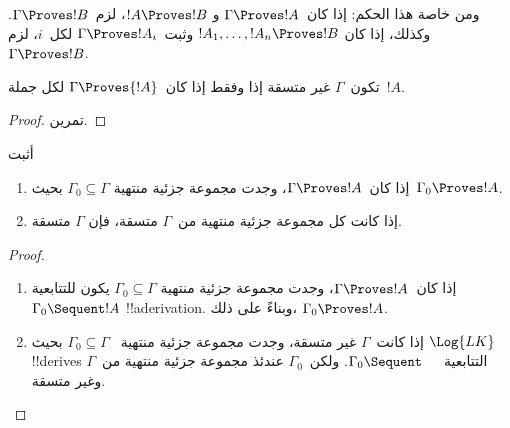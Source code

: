 \documentclass[../../../include/open-logic-section]{subfiles}
\begin{document}
ومن خاصة هذا الحكم: إذا كان~$\Gamma \Proves !A$ و
$!A \Proves !B$، لزم~$\Gamma \Proves !B$.
وكذلك، إذا كان $!A_1, \dots, !A_n \Proves !B$ وثبت~$\Gamma \Proves !A_i$ لكل~$i$،
لزم~$\Gamma \Proves !B$.

\begin{prop}
تكون~$\Gamma$ غير متسقة إذا وفقط إذا كان~$\Gamma \Proves {!A}$ لكل
  جملة~$!A$.
\end{prop}

\begin{proof}
تمرين.
\end{proof}

\begin{prob}
أثبت 
\end{prob}

\begin{prop}[التراص]
  \begin{enumerate}
  \item إذا كان~$\Gamma \Proves !A$، وجدت مجموعة جزئية منتهية
    $\Gamma_0 \subseteq \Gamma$ بحيث~$\Gamma_0 \Proves !A$.
  \item إذا كانت كل مجموعة جزئية منتهية من~$\Gamma$ متسقة، فإن
    $\Gamma$ متسقة.
  \end{enumerate}
\end{prop}

\begin{proof}
  \begin{enumerate}
    \item إذا كان~$\Gamma \Proves !A$، وجدت مجموعة جزئية منتهية
      $\Gamma_0 \subseteq \Gamma$ يكون للتتابعية
      $\Gamma_0 \Sequent !A$ !!a{derivation}. وبناءً على ذلك،
      $\Gamma_0 \Proves !A$.
    \item إذا كانت~$\Gamma$ غير متسقة، وجدت مجموعة جزئية منتهية
      ~$\Gamma_0 \subseteq \Gamma$ بحيث $\Log{LK}$ !!{derive}s
      التتابعية~$\Gamma_0 \Sequent \quad$. ولكن~$\Gamma_0$ عندئذ
      مجموعة جزئية منتهية من~$\Gamma$ وغير متسقة.
  \end{enumerate}
\end{proof}
\end{document}
